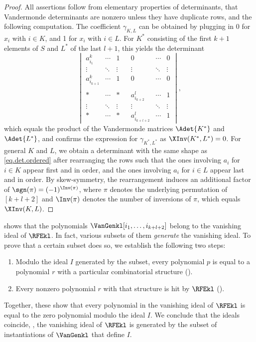 \begin{proof}
  All assertions follow from
  elementary properties of determinants, that Vandermonde
  determinants are nonzero unless they have duplicate rows,
  and the following computation. The coefficient $\gamma_{K,L}$ can be obtained by plugging in 0 for $x_i$ with $i \in K$, and 1 for $x_i$ with $i \in L$. For $K^*$ consisting of the first $k+1$ elements of $S$ and $L^*$ of the last $l+1$, this yields the determinant
  \begin{equation}\label{eq.det.ordered}
    \begin{vmatrix*}
      a_{i_1}^k     & \cdots & 1      && 0      & \cdots & 0 \\
      \vdots        & \ddots & \vdots && \vdots & \ddots & \vdots \\
      a_{i_{k+1}}^k & \cdots & 1      && 0      & \cdots & 0 \\
      \\
      *      & \cdots & *      && a_{i_{k+2}}^l   & \cdots & 1 \\
      \vdots & \ddots & \vdots && \vdots          & \ddots & \vdots \\
      *      & \cdots & *      && a_{i_{k+l+2}}^l & \cdots & 1
    \end{vmatrix*},
  \end{equation}
  which equals the product of the Vandermonde matrices $\Adet{K^*}$ and $\Adet{L^*}$, and confirms the expression for $\gamma_{K^*,L^*}$ as $\XInv(K^*,L^*)=0$. For general $K$ and $L$, we obtain a determinant with the same shape as \eqref{eq.det.ordered} after rearranging the rows such that the ones involving $a_i$ for $i \in K$ appear first and in order, and the ones involving $a_i$ for $i \in L$ appear last and in order. By skew-symmetry, the rearrangement induces an additional factor of $\sgn(\pi) = (-1)^{\Inv(\pi)}$, where $\pi$ denotes the underlying permutation of $[k+l+2]$ and $\Inv(\pi)$ denotes the number of inversions of $\pi$, which equals $\XInv(K,L)$. 
\end{proof}

 shows that the polynomials $\VanGenkl[i_1,\dots,i_{k+l+2}]$ belong to the vanishing ideal of $\RFEkl$. In fact, various subsets of them \emph{generate} the vanishing ideal. To prove that a certain subset does so, we establish the following two steps:
\begin{enumerate}
  \item
    Modulo the ideal $I$ generated by the subset, 
    every polynomial $p$ is equal
    to a polynomial $r$ with a particular combinatorial structure
    ().
  \item
    Every nonzero polynomial $r$ with that structure is hit by
    $\RFEkl$ ().
\end{enumerate}
Together,
these show that every polynomial in the vanishing ideal of $\RFEkl$ is equal to the zero polynomial modulo the ideal $I$. 
We conclude that the ideals coincide,
\ie, the vanishing ideal of $\RFEkl$ is generated by the subset of instantiations of \(\VanGenkl\) that define $I$.

